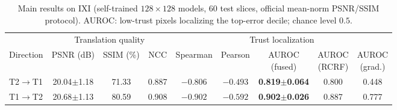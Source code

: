 \begin{table}[htbp]
\centering\footnotesize\setlength{\tabcolsep}{3.6pt}
\caption{Main results on IXI (self-trained $128\times128$ models, 60 test
slices, official mean-norm PSNR/SSIM protocol). AUROC: low-trust pixels
localizing the top-error decile; chance level $0.5$.}
\label{tab:main_en}
\begin{tabular}{lcccccccc}
\toprule
 & \multicolumn{3}{c}{Translation quality} & \multicolumn{5}{c}{Trust localization} \\
\cmidrule(lr){2-4}\cmidrule(lr){5-9}
Direction & PSNR (dB) & SSIM (\%) & NCC & Spearman & Pearson & \makecell{AUROC\\(fused)} & \makecell{AUROC\\(RCRF)} & \makecell{AUROC\\(grad.)} \\
\midrule
T2$\to$T1 & 20.04$\pm$1.18 & 71.33 & 0.887 & $-0.806$ & $-0.493$ & \textbf{0.819$\pm$0.064} & 0.800 & 0.448 \\
T1$\to$T2 & 20.68$\pm$1.13 & 80.59 & 0.908 & $-0.902$ & $-0.592$ & \textbf{0.902$\pm$0.026} & 0.887 & 0.777 \\
\bottomrule
\end{tabular}
\end{table}
